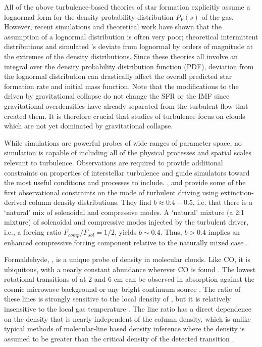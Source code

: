 All of the above turbulence-based theories of star formation explicitly assume a
lognormal form for the density probability distribution $P_V(s)$ of the gas.
However, recent simulations \citep{Kritsuk2007a, Schmidt2009a, Federrath2010a, Federrath2013a, Federrath2013b} and theoretical work
\citep{Hopkins2013a} have shown that the assumption of a
lognormal distribution is often very poor; theoretical intermittent distributions and 
simulated \rhoPDF's deviate from lognormal by orders of magnitude
at the extremes of the density distributions.  Since these theories all involve
an integral over the density probability distribution function (PDF), deviation from
the lognormal distribution can drastically affect the overall predicted star formation
rate \citep[e.g.]{Cho2011a,Collins2012a} and initial mass function.
Note that the modifications to the \rhoPDF driven by gravitational collapse
do not change the SFR or the IMF
\citep{Klessen2000a,Kritsuk2011a,Federrath2013a} since gravitational overdensities have
already separated from the turbulent flow that created them. It is therefore
crucial that studies of turbulence focus on clouds which are not yet dominated
by gravitational collapse.

While simulations are powerful probes of wide ranges of parameter space, no
simulation is capable of including all of the physical processes and spatial
scales relevant to turbulence.  Observations are required to provide additional
constraints on properties of interstellar turbulence and guide simulators
toward the most useful conditions and processes to include.
\citet{Brunt2010c}, \citet{Kainulainen2012a} and \citet{Kainulainen2013a}
provide some of the first observational constraints on the mode of turbulent
driving using extinction-derived column density distributions.
They find $b\approx0.4-0.5$, i.e. that there is a `natural' mix of solenoidal
and compressive modes.  A `natural' mixture (a 2:1 mixture) of solenoidal and
compressive modes injected by the turbulent driver, i.e., a forcing ratio
$F_{comp}/F_{sol} = 1/2$, yields $b\sim0.4$. Thus, $b>0.4$ implies an enhanced
compressive forcing component relative to the naturally mixed case \citep[see
Figure 8 in][]{Federrath2010a}.


Formaldehyde, \formaldehyde, is a unique probe of density in molecular clouds.
Like CO, it is ubiquitous, with a nearly constant abundance wherever CO is
found \citep{Mangum1993a,Tang2013a}.  The lowest rotational transitions of
\ortho at 2 and 6 cm can be observed in absorption against the cosmic microwave
background or any bright continuum source \citep{Ginsburg2011a,Darling2012b}.
The ratio of these lines is strongly sensitive to the local density of \hh, but
it is relatively insensitive to the local gas temperature
\citep{Troscompt2009a,Wiesenfeld2013a}.  The \formaldehyde line ratio has a
direct dependence on the density that is nearly independent of the column
density, which is unlike typical methods of molecular-line based density
inference where the density is assumed to be greater than the critical density
of the detected transition .

